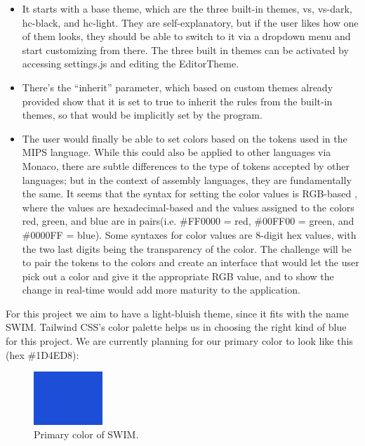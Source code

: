 \documentclass[
    paper=letter,
    parskip=half,
    fontsize=12pt,
    titlepage=firstiscover,
    toc=bibliography,
    numbers=endperiod
]{scrartcl}
\providecommand{\tightlist}{%
  \setlength{\itemsep}{0pt}\setlength{\parskip}{0pt}}
\begin{document}
\begin{itemize}
    \tightlist
    \item It starts with a base theme, which are the three built-in themes, vs,
    vs-dark, hc-black, and hc-light. They are self-explanatory, but if the
    user likes how one of them looks, they should be able to switch to it
    via a dropdown menu and start customizing from there. The three built
    in themes can be activated by accessing settings.js and editing the
    EditorTheme.
    \item There's the ``inherit'' parameter, which based on custom themes
    already provided \cite{monaco-themes} show that it is set to true to inherit the rules
    from the built-in themes, so that would be implicitly set by the
    program.
    \item The user would finally be able to set colors based on the tokens used
    in the MIPS language. While this could also be applied to other
    languages via Monaco, there are subtle differences to the type of
    tokens accepted by other languages; but in the context of assembly
    languages, they are fundamentally the same. It seems that the syntax
    for setting the color values is RGB-based \cite{rapidtables-rgb}, where the values are
    hexadecimal-based and the values assigned to the colors red, green,
    and blue are in pairs(i.e. \#FF0000 = red, \#00FF00 = green, and
    \#0000FF = blue). Some syntaxes for color values are 8-digit hex
    values, with the two last digits being the transparency of the color.
    The challenge will be to pair the tokens to the colors and create an
    interface that would let the user pick out a color and give it the
    appropriate RGB value, and to show the change in real-time would add
    more maturity to the application.
\end{itemize}

For this project we aim to have a light-bluish theme, since it fits with
the name SWIM. Tailwind CSS's color palette helps us in choosing the
right kind of blue for this project. We are currently planning for our
primary color to look like this (hex \#1D4ED8):

\begin{figure}[H]
    \includegraphics[height=2cm]{color-primary}
    \caption{Primary color of SWIM.}
\end{figure}
\end{document}
